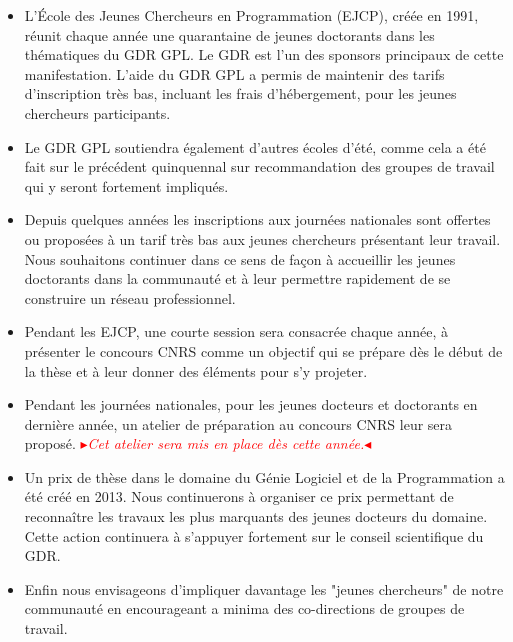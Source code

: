 \documentclass[11pt]{article}
\newcommand{\mynote}[3][black]{\textcolor{#1}{\fbox{\bfseries\sffamily\scriptsize{#2}}
{\small$\blacktriangleright$\textsf{\emph{#3}}$\blacktriangleleft$}}}
\newcommand{\TODO}[1]{\mynote[red]{TODO}{#1}}
\begin{document}
\begin{itemize}
\item L'École des Jeunes Chercheurs en Programmation (EJCP), créée en 1991, réunit
  chaque année une quarantaine de jeunes doctorants dans les thématiques du GDR
  GPL. Le GDR est l'un des sponsors principaux de cette manifestation.
  L'aide du GDR GPL a permis de maintenir des tarifs d'inscription très bas, incluant
  les frais d'hébergement, pour les jeunes chercheurs participants. 
  
\item Le GDR GPL soutiendra également d'autres écoles d'été, comme cela a été
  fait sur le précédent quinquennal sur recommandation des groupes de travail
  qui y seront fortement impliqués. 

\item Depuis quelques années les inscriptions aux journées nationales sont
  offertes ou proposées à un tarif très bas aux jeunes chercheurs
  présentant leur travail. Nous souhaitons continuer dans ce sens de façon à
  accueillir les jeunes doctorants dans la communauté et à leur permettre
  rapidement de se construire un réseau professionnel.
  
  \item Pendant les EJCP, une courte session sera consacrée chaque année, à présenter le concours CNRS comme un objectif qui se prépare dès le début de la thèse et à leur donner des éléments pour s’y projeter.

\item Pendant les journées nationales, pour les jeunes docteurs et doctorants en dernière année, un atelier de préparation au concours CNRS leur sera proposé. \TODO{Cet atelier sera mis en place dès cette année.}

  
\item Un prix de thèse dans le domaine du Génie
  Logiciel et de la Programmation a été créé en 2013. 
  Nous continuerons à organiser ce prix permettant de reconnaître les travaux les plus
  marquants des jeunes docteurs du domaine. 
  Cette action continuera à s'appuyer fortement sur le conseil scientifique du GDR.
  
  \item Enfin nous envisageons d'impliquer davantage les "jeunes chercheurs" de notre communauté en encourageant a minima des co-directions de groupes de travail. 
 \end{itemize}
\end{document}

